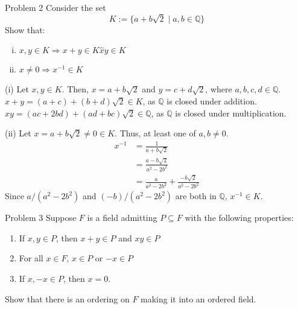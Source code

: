 \documentclass[10pt]{extarticle}
\newcommand{\Q}{\mathbb{Q}}
\begin{document}
  \begin{problem}{Problem 2}
    Consider the set
    \[
      K:= \{a + b\sqrt{2} \mid a,b\in\Q\}
    \] 
    Show that:
    \begin{enumerate}[(i)]
      \item $x,y\in K \Rightarrow x+y\in K \hat xy\in K$
      \item $x\neq 0 \Rightarrow x^{-1}\in K$
    \end{enumerate}
    \tcblower
    \begin{problem}{(i)}
      Let $x,y\in K$. Then, $x = a+b\sqrt{2}$ and $y = c+d\sqrt{2}$, where $a,b,c,d\in \Q$.\\

      $x+y = (a+c) + (b+d)\sqrt{2}\in K$, as $\Q$ is closed under addition.\\

      $xy = (ac + 2bd) + (ad + bc)\sqrt{2}\in\Q$, as $\Q$ is closed under multiplication.
    \end{problem}
    \begin{problem}{(ii)}
      Let $x=a+b\sqrt{2}\neq 0\in K$. Thus, at least one of $a,b\neq 0$.
      \begin{align*}
        x^{-1} &= \frac{1}{a+b\sqrt{2}}\\
               &= \frac{a-b\sqrt{2}}{a^2-2b^2}\\
               &= \frac{a}{a^2-2b^2} + \frac{-b\sqrt{2}}{a^2-2b^2}
      \end{align*}
      Since $a/(a^2 - 2b^2)$ and $(-b)/(a^2-2b^2)$ are both in $\Q$, $x^{-1}\in K$.
    \end{problem}
  \end{problem}
  \begin{problem}{Problem 3}
    Suppose $F$ is a field admitting $P\subseteq F$ with the following properties:
    \begin{enumerate}[(C1)]
      \item If $x,y\in P$, then $x+y\in P$ and $xy\in P$
      \item For all $x\in F$, $x\in P$ or $-x\in P$
      \item If $x,-x\in P$, then $x = 0$.
    \end{enumerate}
    Show that there is an ordering on $F$ making it into an ordered field.
  \end{problem}
\end{document}

